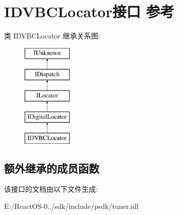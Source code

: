 \hypertarget{interface_i_d_v_b_c_locator}{}\section{I\+D\+V\+B\+C\+Locator接口 参考}
\label{interface_i_d_v_b_c_locator}
类 I\+D\+V\+B\+C\+Locator 继承关系图\+:\begin{figure}[H]
\begin{center}
\leavevmode
\includegraphics[height=5.000000cm]{interface_i_d_v_b_c_locator}
\end{center}
\end{figure}
\subsection*{额外继承的成员函数}


该接口的文档由以下文件生成\+:\begin{DoxyCompactItemize}
\item 
E\+:/\+React\+O\+S-\/0../sdk/include/psdk/tuner.\+idl\end{DoxyCompactItemize}
